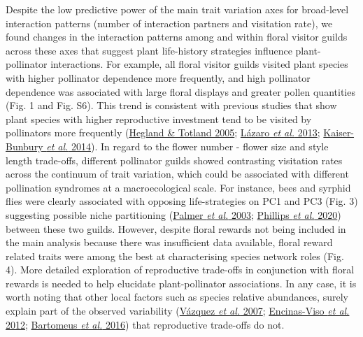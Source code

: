 \documentclass[
  12pt,
  a4paper,
]{article}
\begin{document}
Despite the low predictive power of the main trait variation axes for broad-level interaction patterns (number of interaction partners and visitation rate), we found changes in the interaction patterns among and within floral visitor guilds across these axes that suggest plant life-history strategies influence plant-pollinator interactions. For example, all floral visitor guilds visited plant species with higher pollinator dependence more frequently, and high pollinator dependence was associated with large floral displays and greater pollen quantities (Fig. 1 and Fig. S6). This trend is consistent with previous studies that show plant species with higher reproductive investment tend to be visited by pollinators more frequently (\protect\hyperlink{ref-hegland2005}{Hegland \& Totland 2005}; \protect\hyperlink{ref-lazaro2013}{Lázaro \emph{et al.} 2013}; \protect\hyperlink{ref-kaiser2014}{Kaiser-Bunbury \emph{et al.} 2014}). In regard to the flower number - flower size and style length trade-offs, different pollinator guilds showed contrasting visitation rates across the continuum of trait variation, which could be associated with different pollination syndromes at a macroecological scale. For instance, bees and syrphid flies were clearly associated with opposing life-strategies on PC1 and PC3 (Fig. 3) suggesting possible niche partitioning (\protect\hyperlink{ref-palmer2003}{Palmer \emph{et al.} 2003}; \protect\hyperlink{ref-phillips2020}{Phillips \emph{et al.} 2020}) between these two guilds. However, despite floral rewards not being included in the main analysis because there was insufficient data available, floral reward related traits were among the best at characterising species network roles (Fig. 4). More detailed exploration of reproductive trade-offs in conjunction with floral rewards is needed to help elucidate plant-pollinator associations. In any case, it is worth noting that other local factors such as species relative abundances, surely explain part of the observed variability (\protect\hyperlink{ref-vazquez2007}{Vázquez \emph{et al.} 2007}; \protect\hyperlink{ref-encinas2012}{Encinas-Viso \emph{et al.} 2012}; \protect\hyperlink{ref-bartomeus2016}{Bartomeus \emph{et al.} 2016}) that reproductive trade-offs do not.
\end{document}

